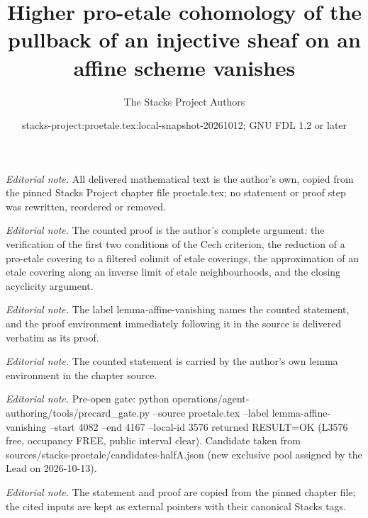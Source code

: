 \documentclass[10pt,a4paper]{amsart}
\title{Higher pro-etale cohomology of the pullback of an injective sheaf on an affine scheme vanishes}
\author{The Stacks Project Authors}
\date{stacks-project:proetale.tex:local-snapshot-20261012; GNU FDL 1.2 or later}
\theoremstyle{plain}
\theoremstyle{definition}
\theoremstyle{remark}
\numberwithin{equation}{subsection}
\begin{document}
\maketitle
\noindent\textit{Editorial note.} All delivered mathematical text is the author's own, copied from the pinned Stacks Project chapter file proetale.tex; no statement or proof step was rewritten, reordered or removed.\par\medskip
\noindent\textit{Editorial note.} The counted proof is the author's complete argument: the verification of the first two conditions of the Cech criterion, the reduction of a pro-etale covering to a filtered colimit of etale coverings, the approximation of an etale covering along an inverse limit of etale neighbourhoods, and the closing acyclicity argument.\par\medskip
\noindent\textit{Editorial note.} The label lemma-affine-vanishing names the counted statement, and the proof environment immediately following it in the source is delivered verbatim as its proof.\par\medskip
\noindent\textit{Editorial note.} The counted statement is carried by the author's own lemma environment in the chapter source.\par\medskip
\noindent\textit{Editorial note.} Pre-open gate: python operations/agent-authoring/tools/precard\_gate.py --source proetale.tex --label lemma-affine-vanishing --start 4082 --end 4167 --local-id 3576 returned RESULT=OK (L3576 free, occupancy FREE, public interval clear). Candidate taken from sources/stacks-proetale/candidates-halfA.json (new exclusive pool assigned by the Lead on 2026-10-13).\par\medskip
\noindent\textit{Editorial note.} The statement and proof are copied from the pinned chapter file; the cited inputs are kept as external pointers with their canonical Stacks tags.\par\medskip
\end{document}
